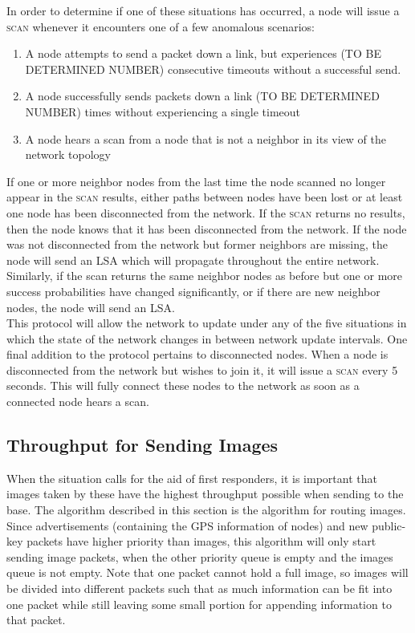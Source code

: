 \documentclass[letterpaper]{article}
\begin{document}
\noindent In order to determine if one of these situations has occurred, a node will issue a 
\textsc{scan} whenever it encounters one of a few anomalous scenarios:

\begin{enumerate}
  \item A node attempts to send a packet down a link, but experiences (TO BE DETERMINED NUMBER) 
  consecutive timeouts without a successful send.
  \item A node successfully sends packets down a link (TO BE DETERMINED NUMBER) times without
  experiencing a single timeout
  \item A node hears a scan from a node that is not a neighbor in its view of the network topology
\end{enumerate}

\noindent If one or more neighbor nodes from the last time the node scanned no longer appear in 
the \textsc{scan} results, either paths between nodes have been lost or at least one node has
been disconnected from the network. If the \textsc{scan} returns no results, then the node knows
that it has been disconnected from the network. If the node was not disconnected from the network
but former neighbors are missing, the node will send an LSA which will propagate throughout the
entire network. Similarly, if the scan returns the same neighbor nodes as before but one or more
success probabilities have changed significantly, or if there are new neighbor nodes, the node will
send an LSA.
\\

\noindent This protocol will allow the network to update under any of the five situations in which
the state of the network changes in between network update intervals. One final addition to the
protocol pertains to disconnected nodes. When a node is disconnected from the network but wishes to
join it, it will issue a \textsc{scan} every 5 seconds. This will fully connect these nodes to the
network as soon as a connected node hears a scan. 

\subsection{Throughput for Sending Images}

When the situation calls for the aid of first responders, it is important that images taken by these have the highest throughput possible when sending to the base. The algorithm described in this section is the algorithm for routing images. Since advertisements (containing the GPS information of nodes) and new public-key packets have higher priority than images, this algorithm will only start sending image packets, when the other priority queue is empty and the images queue is not empty. Note that one packet cannot hold a full image, so images will be divided into different packets such that as much information can be fit into one packet while still leaving some small portion for appending information to that packet.
\end{document}
